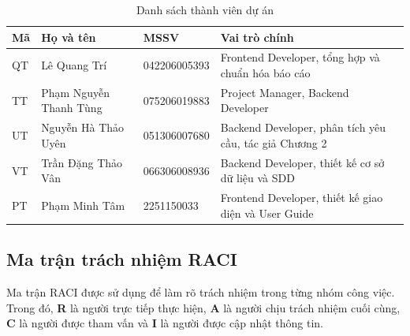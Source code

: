 \begin{table}[H]
    \centering
    \caption{Danh sách thành viên dự án}
    \label{tab:team-members}
    \renewcommand{\arraystretch}{1.35}
    \begin{tabularx}{\textwidth}{|p{1.1cm}|p{4.0cm}|p{3.2cm}|Y|}
        \hline
        \textbf{Mã} & \textbf{Họ và tên} & \textbf{MSSV} & \textbf{Vai trò chính} \\
        \hline
        QT & Lê Quang Trí & 042206005393 & Frontend Developer, tổng hợp và chuẩn hóa báo cáo \\
        \hline
        TT & Phạm Nguyễn Thanh Tùng & 075206019883 & Project Manager, Backend Developer \\
        \hline
        UT & Nguyễn Hà Thảo Uyên & 051306007680 & Backend Developer, phân tích yêu cầu, tác giả Chương 2 \\
        \hline
        VT & Trần Đặng Thảo Vân & 066306008936 & Backend Developer, thiết kế cơ sở dữ liệu và SDD \\
        \hline
        PT & Phạm Minh Tâm & 2251150033 & Frontend Developer, thiết kế giao diện và User Guide \\
        \hline
    \end{tabularx}
\end{table}

\subsection{Ma trận trách nhiệm RACI}

Ma trận RACI được sử dụng để làm rõ trách nhiệm trong từng nhóm công việc. Trong đó, \textbf{R} là người trực tiếp thực hiện, \textbf{A} là người chịu trách nhiệm cuối cùng, \textbf{C} là người được tham vấn và \textbf{I} là người được cập nhật thông tin.

